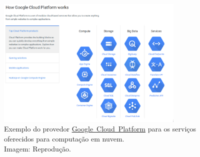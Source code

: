 \begin{figure}[ht]
    \centering
    \includegraphics[width=0.8\textwidth]{img/googlecloud.png}
    \caption{Exemplo do provedor
             \href{https://cloud.google.com/}{Google~Cloud~Platform}
             para os serviços oferecidos para computação em nuvem.\\
             Imagem: Reprodução.
            }
    \label{img:googlecloud}
\end{figure}

\undef\itemm
